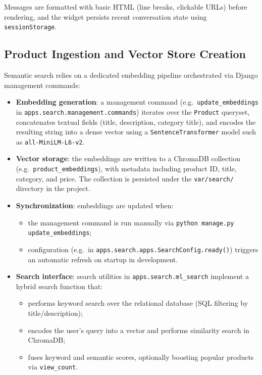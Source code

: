 Messages are formatted with basic HTML (line breaks, clickable URLs) before rendering, and the widget persists recent conversation state using \texttt{sessionStorage}.

\subsection{Product Ingestion and Vector Store Creation}

Semantic search relies on a dedicated embedding pipeline orchestrated via Django management commands:

\begin{itemize}
  \item \textbf{Embedding generation}: a management command (e.g.\ \texttt{update\_embeddings} in \texttt{apps.search.management.commands}) iterates over the \texttt{Product} queryset, concatenates textual fields (title, description, category title), and encodes the resulting string into a dense vector using a \texttt{SentenceTransformer} model such as \texttt{all-MiniLM-L6-v2}.
  \item \textbf{Vector storage}: the embeddings are written to a ChromaDB collection (e.g.\ \texttt{product\_embeddings}), with metadata including product ID, title, category, and price. The collection is persisted under the \texttt{var/search/} directory in the project.
  \item \textbf{Synchronization}: embeddings are updated when:
  \begin{itemize}
    \item the management command is run manually via \texttt{python manage.py \\ update\_embeddings};
    \item configuration (e.g.\ in \texttt{apps.search.apps.SearchConfig.ready()}) triggers an automatic refresh on startup in development.
  \end{itemize}
  \item \textbf{Search interface}: search utilities in \texttt{apps.search.ml\_search} implement a hybrid search function that:
  \begin{itemize}
    \item performs keyword search over the relational database (SQL filtering by title/description);
    \item encodes the user’s query into a vector and performs similarity search in ChromaDB;
    \item fuses keyword and semantic scores, optionally boosting popular products via \texttt{view\_count}.
  \end{itemize}
\end{itemize}

